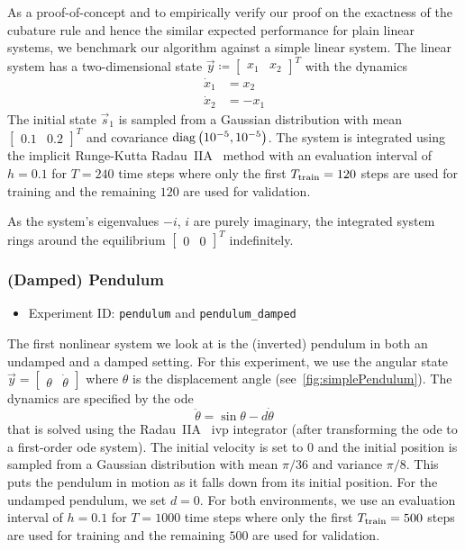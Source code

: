 			As a proof-of-concept and to empirically verify our proof on the exactness of the cubature rule and hence the similar expected performance for plain linear systems, we benchmark our algorithm against a simple linear system. The linear system has a two-dimensional state \( \vec{y} \coloneqq \begin{bmatrix} x_1 & x_2 \end{bmatrix}^T \) with the dynamics
			\begin{align*}
				\dot{x}_1 &= x_2 \\
				\dot{x}_2 &= -x_1
			\end{align*}
			The initial state \( \vec{s}_1 \) is sampled from a Gaussian distribution with mean \( \begin{bmatrix} 0.1 & 0.2 \end{bmatrix}^T \) and covariance \( \operatorname{diag}\big(10^{-5}, 10^{-5}\big) \). The system is integrated using the implicit Runge-Kutta Radau~IIA~\cite{guglielmiImplementingRadauIIA2001} method with an evaluation interval of \( h = 0.1 \) for \( T = 240 \) time steps where only the first \( T_{\mathrm{train}} = 120 \) steps are used for training and the remaining \(120\) are used for validation.

			As the system's eigenvalues \( -i \), \( i \) are purely imaginary, the integrated system rings around the equilibrium \( \begin{bmatrix} 0 & 0 \end{bmatrix}^T \) indefinitely.

		\subsubsection{(Damped) Pendulum}
			\begin{itemize}
				\item Experiment ID: \texttt{pendulum} and \texttt{pendulum\_damped}
			\end{itemize}

			The first nonlinear system we look at is the (inverted) pendulum in both an undamped and a damped setting. For this experiment, we use the angular state \( \vec{y} = \begin{bmatrix} \theta & \dot{\theta} \end{bmatrix} \) where \(\theta\) is the displacement angle (see~\autoref{fig:simplePendulum}). The dynamics are specified by the \ac{ode}
			\begin{equation*}
				\ddot{\theta} = \sin\theta - d \dot{\theta}
			\end{equation*}
			that is solved using the Radau~IIA~\cite{guglielmiImplementingRadauIIA2001} \ac{ivp} integrator (after transforming the \ac{ode} to a first-order \ac{ode} system). The initial velocity is set to \(0\) and the initial position is sampled from a Gaussian distribution with mean \( \pi/36 \) and variance \( \pi/8 \). This puts the pendulum in motion as it falls down from its initial position. For the undamped pendulum, we set \( d = 0 \). For both environments, we use an evaluation interval of \( h = 0.1 \) for \( T = 1000 \) time steps where only the first \( T_{\mathrm{train}} = 500 \) steps are used for training and the remaining \(500\) are used for validation.

